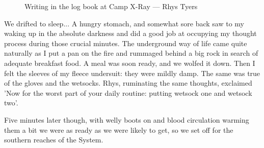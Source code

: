 \begin{figure}[t]
\checkoddpage \ifoddpage \forcerectofloat \else \forceversofloat \fi
\centering
{}
\caption{Writing in the log book at Camp X-Ray --- Rhys Tyers}
\label{Camp X-Ray}
\end{figure}

We drifted to sleep... A hungry stomach, and somewhat sore back saw to my waking up in the absolute darkness and did a good job at occupying my thought process during those crucial minutes. The underground way of life came quite naturally as I put a pan on the fire and rummaged behind a big rock in search of adequate breakfast food. A meal was soon ready, and we wolfed it down. Then I felt the sleeves of my fleece undersuit: they were mildly damp. The same was true of the gloves and the wetsocks. Rhys, ruminating the same thoughts, exclaimed 'Now for the worst part of your daily routine: putting wetsock one and wetsock two'. 

 Five minutes later though, with welly boots on and blood circulation warming them a bit we were as ready as we were likely to get, so we set off for the southern reaches of the System. 
 
\begin{figure}[t!]
\end{figure}

